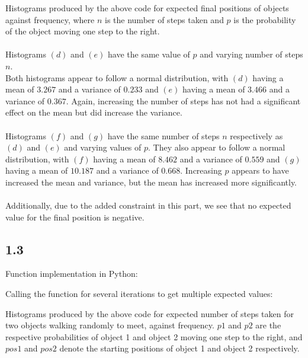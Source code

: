 \documentclass[answers]{exam}
\begin{document}
Histograms produced by the above code for expected final positions of objects against frequency, where $n$ is the number of steps taken and $p$ is the probability of the object moving one step to the right.\\
\\
Histograms $(d)$ and $(e)$ have the same value of $p$ and varying number of steps $n$. \\
Both histograms appear to follow a normal distribution, with $(d)$ having a mean of $3.267$ and a variance of $0.233$ and $(e)$ having a mean of $3.466$ and a variance of $0.367$. Again, increasing the number of steps has not had a significant effect on the mean but did increase the variance.\\ \\
Histograms $(f)$ and $(g)$ have the same number of steps $n$ respectively as $(d)$ and $(e)$ and varying values of $p$. 
They also appear to follow a normal distribution, with $(f)$ having a mean of $8.462$ and a variance of $0.559$ and $(g)$ having a mean of $10.187$ and a variance of $0.668$. Increasing $p$ appears to have increased the mean and variance, but the mean has increased more significantly. \\ \\
Additionally, due to the added constraint in this part, we see that no expected value for the final position is negative.

\pagebreak
\subsection*{1.3}
Function implementation in Python:

Calling the function for several iterations to get multiple expected values:

\pagebreak
Histograms produced by the above code for expected number of steps taken for two objects walking randomly to meet, against frequency. $p1$ and $p2$ are the respective probabilities of object 1 and object 2 moving one step to the right, and $pos1$ and $pos2$ denote the starting positions of object 1 and object 2 respectively.\\
\end{document}

